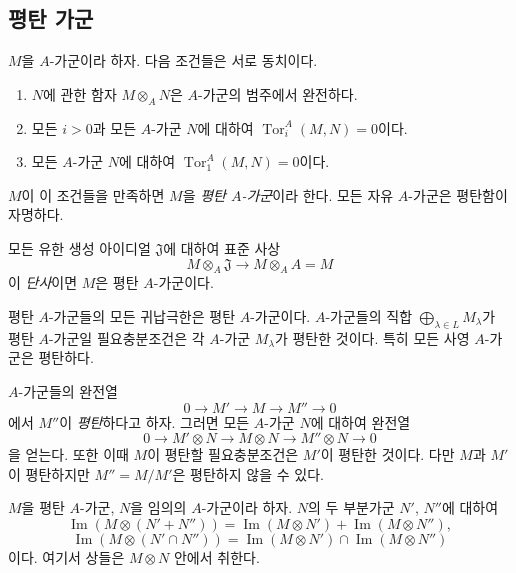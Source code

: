 \subsection{평탄 가군}
\label{subsection:0.6.1-ko}

\begin{env}[6.1.1]
\label{0.6.1.1-ko}
$M$을 $A$-가군이라 하자. 다음 조건들은 서로 동치이다.
\begin{enumerate}
  \item[$a)$] $N$에 관한 함자 $M\otimes_A N$은 $A$-가군의 범주에서
    완전하다.
  \item[$b)$] 모든 $i>0$과 모든 $A$-가군 $N$에 대하여
    $\operatorname{Tor}_i^A(M,N)=0$이다.
  \item[$c)$] 모든 $A$-가군 $N$에 대하여
    $\operatorname{Tor}_1^A(M,N)=0$이다.
\end{enumerate}

$M$이 이 조건들을 만족하면 $M$을 \emph{평탄 $A$-가군}이라 한다.
모든 자유 $A$-가군은 평탄함이 자명하다.

모든 유한 생성 아이디얼 $\mathfrak J$에 대하여 표준 사상
\[
  M\otimes_A\mathfrak J\longrightarrow M\otimes_A A=M
\]
이 \emph{단사}이면 $M$은 평탄 $A$-가군이다.
\end{env}

\begin{env}[6.1.2]
\label{0.6.1.2-ko}
평탄 $A$-가군들의 모든 귀납극한은 평탄 $A$-가군이다.
$A$-가군들의 직합 $\bigoplus_{\lambda\in L}M_\lambda$가 평탄
$A$-가군일 필요충분조건은 각 $A$-가군 $M_\lambda$가 평탄한
것이다. 특히 모든 사영 $A$-가군은 평탄하다.

$A$-가군들의 완전열
\[
  0\longrightarrow M'\longrightarrow M\longrightarrow M''
  \longrightarrow 0
\]
에서 $M''$이 \emph{평탄}하다고 하자. 그러면 모든 $A$-가군 $N$에
대하여 완전열
\[
  0\longrightarrow M'\otimes N\longrightarrow M\otimes N
  \longrightarrow M''\otimes N\longrightarrow 0
\]
을 얻는다. 또한 이때 $M$이 평탄할 필요충분조건은 $M'$이 평탄한
것이다. 다만 $M$과 $M'$이 평탄하지만 $M''=M/M'$은 평탄하지 않을
수 있다.
\end{env}

\begin{env}[6.1.3]
\label{0.6.1.3-ko}
$M$을 평탄 $A$-가군, $N$을 임의의 $A$-가군이라 하자. $N$의 두
부분가군 $N'$, $N''$에 대하여
\[
  \operatorname{Im}(M\otimes(N'+N''))
  =\operatorname{Im}(M\otimes N')+\operatorname{Im}(M\otimes N''),
\]
\[
  \operatorname{Im}(M\otimes(N'\cap N''))
  =\operatorname{Im}(M\otimes N')\cap\operatorname{Im}(M\otimes N'')
\]
이다. 여기서 상들은 $M\otimes N$ 안에서 취한다.
\end{env}


